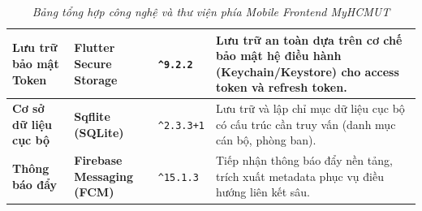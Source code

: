 \begin{table}[H]
\begin{tabularx}{\textwidth}{|L{2.8cm}|L{3.4cm}|L{1.8cm}|Y|}
    \hline
    \textbf{Lưu trữ bảo mật Token} & \textbf{Flutter Secure Storage} \cite{android_keystore_doc,ios_keychain_doc} & \texttt{\textasciicircum 9.2.2} & Lưu trữ an toàn dựa trên cơ chế bảo mật hệ điều hành (Keychain/Keystore) cho access token và refresh token. \\
    \hline
    \textbf{Cơ sở dữ liệu cục bộ} & \textbf{Sqflite (SQLite)} \cite{sqflite_doc} & \texttt{\textasciicircum 2.3.3+1} & Lưu trữ và lập chỉ mục dữ liệu cục bộ có cấu trúc cần truy vấn (danh mục cán bộ, phòng ban). \\
    \hline
    \textbf{Thông báo đẩy} & \textbf{Firebase Messaging (FCM)} \cite{fcm_doc} & \texttt{\textasciicircum 15.1.3} & Tiếp nhận thông báo đẩy nền tảng, trích xuất metadata phục vụ điều hướng liên kết sâu. \\
    \hline
    \end{tabularx}
    \caption{\textit{Bảng tổng hợp công nghệ và thư viện phía Mobile Frontend MyHCMUT}}
    \label{tab:summary_frontend_tech}
\end{table}